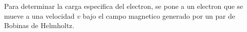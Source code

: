 Para determinar la carga especifica del electron, se pone a un electron que se mueve a una velocidad $v$ bajo el campo magnetico 
generado por un par de Bobinas de Helmholtz. 
